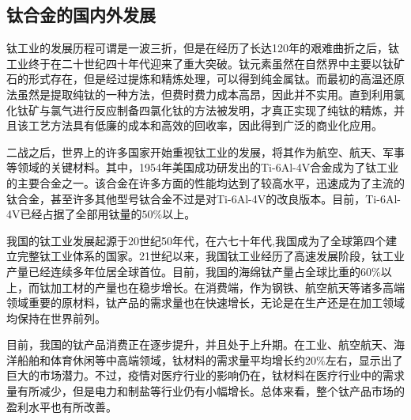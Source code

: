 \subsection{钛合金的国内外发展}
%

钛工业的发展历程可谓是一波三折，但是在经历了长达120年的艰难曲折之后，钛工业终于在二十世纪四十年代迎来了重大突破。钛元素虽然在自然界中主要以钛矿石的形式存在，但是经过提炼和精炼处理，可以得到纯金属钛。而最初的高温还原法虽然是提取纯钛的一种方法，但费时费力成本高昂，因此并不实用。直到利用氯化钛矿与氯气进行反应制备四氯化钛的方法被发明，才真正实现了纯钛的精炼，并且该工艺方法具有低廉的成本和高效的回收率，因此得到广泛的商业化应用。

二战之后，世界上的许多国家开始重视钛工业的发展，将其作为航空、航天、军事等领域的关键材料。其中，1954年美国成功研发出的Ti-6Al-4V合金成为了钛工业的主要合金之一。该合金在许多方面的性能均达到了较高水平，迅速成为了主流的钛合金，甚至许多其他型号钛合金不过是对Ti-6Al-4V的改良版本。目前，Ti-6Al-4V已经占据了全部用钛量的$ 50\% $以上\cite{COLO200102000}。


我国的钛工业发展起源于20世纪50年代，在六七十年代,我国成为了全球第四个建立完整钛工业体系的国家。21世纪以来，我国钛工业经历了高速发展阶段，钛工业产量已经连续多年位居全球首位。目前，我国的海绵钛产量占全球比重的$ 60\% $以上，而钛加工材的产量也在稳步增长。在消费端，作为钢铁、航空航天等诸多高端领域重要的原材料，钛产品的需求量也在快速增长\cite{JSTB202209001}，无论是在生产还是在加工领域均保持在世界前列\cite{TGYJ200405004}。

目前，我国的钛产品消费正在逐步提升，并且处于上升期。在工业、航空航天、海洋船舶和体育休闲等中高端领域，钛材料的需求量平均增长约$ 20\% $左右，显示出了巨大的市场潜力。不过，疫情对医疗行业的影响仍在，钛材料在医疗行业中的需求量有所减少，但是电力和制盐等行业仍有小幅增长。总体来看，整个钛产品市场的盈利水平也有所改善\cite{BJKY202204004}。

